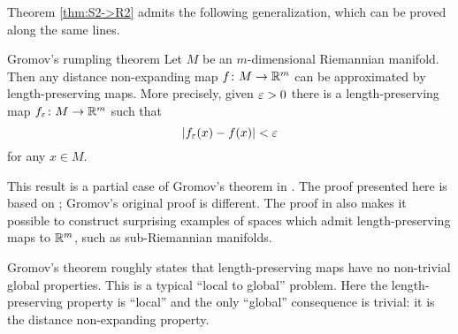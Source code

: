 Theorem \ref{thm:S2->R2} 
admits the following generalization,
which can be proved along the same lines.

\begin{thm}{Gromov's rumpling theorem}
Let $M$ be an $m$-dimensional Riemannian manifold.
Then any distance non-expanding map $f\:M\z\to \RR^m$ 
can be approximated by length-preserving maps.
More precisely, given $\varepsilon>0$ there is a length-preserving map $f_\varepsilon\colon M\to\mathbb{R}^m$
such that 
$$|f_\varepsilon(x)-f(x)|<\varepsilon$$
for any $x\in M$.
\end{thm}

This result is a partial case of Gromov's theorem in \cite[Section~2.4.11]{gromov}.
The proof presented here is based on \cite{petrunin-inverse};
Gromov's original proof is different.
The proof in \cite{petrunin-inverse}
also makes it possible to construct surprising examples of spaces which admit length-preserving maps to $\mathbb{R}^m$, such as sub-Riemannian manifolds.

Gromov's theorem roughly states that length-preserving maps 
have no non-trivial global properties.
This is a typical ``local to global'' problem.
Here
the length-preserving property is ``local''
and the only ``global'' consequence is trivial:
it is the distance non-expanding property.

